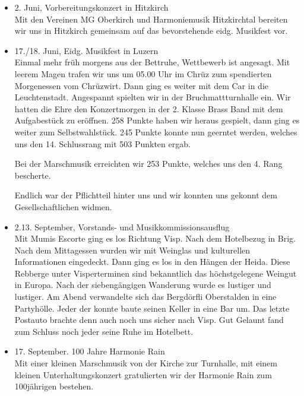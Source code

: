 \begin{history}
\begin{itemize}
        \item[]2. Juni, Vorbereitungskonzert in Hitzkirch\\
        Mit den Vereinen MG Oberkirch und Harmoniemusik Hitzkirchtal bereiten
        wir uns in Hitzkirch gemeinsam auf das bevorstehende eidg. Musikfest
        vor.

        \item[]17./18. Juni, Eidg. Musikfest in Luzern\\
        Einmal mehr früh morgens aus der Bettruhe, Wettbewerb ist angesagt. Mit
        leerem Magen trafen wir uns um 05.00 Uhr im Chrüz zum spendierten
        Morgenessen vom Chrüzwirt. Dann ging es weiter mit dem Car in die
        Leuchtenstadt. Angespannt spielten wir in der Bruchmattturnhalle ein.
        Wir hatten die Ehre den Konzertmorgen in der 2. Klasse Brass Band mit
        dem Aufgabestück zu eröffnen. 258 Punkte haben wir heraus gespielt, dann
        ging es weiter zum Selbstwahlstück. 245 Punkte konnte nun geerntet
        werden, welches uns den 14. Schlussrang mit 503 Punkten ergab.

        Bei der Marschmusik erreichten wir 253 Punkte, welches uns den 4. Rang
        bescherte.

        Endlich war der Pflichtteil hinter uns und wir konnten uns gekonnt dem
        Gesellschaftlichen widmen.

        \item[]2.13. September, Vorstands- und Musikkommissionsausflug\\
        Mit Mumis Escorte ging es los Richtung Visp. Nach dem Hotelbezug in
        Brig. Nach dem Mittagessen wurden wir mit Weinglas und kulturellen
        Informationen eingedeckt. Dann ging es los in den Hängen der Heida.
        Diese Rebberge unter Visperterminen sind bekanntlich das höchstgelegene
        Weingut in Europa. Nach der siebengängigen Wanderung wurde es lustiger
        und lustiger. Am Abend verwandelte sich das Bergdörfli Oberstalden in
        eine Partyhölle. Jeder der konnte baute seinen Keller in eine Bar um.
        Das letzte Postauto brachte denn auch noch uns sicher nach Visp. Gut
        Gelaunt fand zum Schluss noch jeder seine Ruhe im Hotelbett.

        \item[]17. September. 100 Jahre Harmonie Rain\\
        Mit einer kleinen Marschmusik von der Kirche zur Turnhalle, mit einem
        kleinen Unterhaltungskonzert gratulierten wir der Harmonie Rain zum
        100jährigen bestehen.


\end{itemize}
\end{history}
